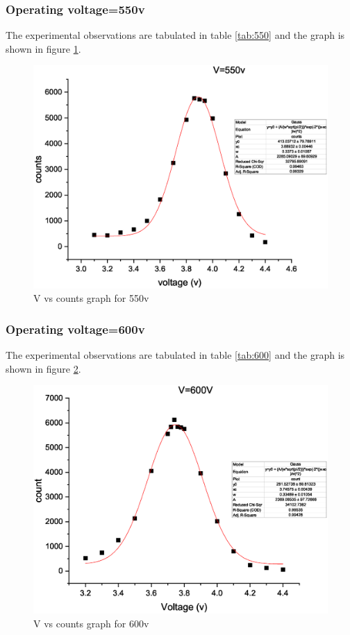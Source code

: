 		\subsubsection{Operating voltage=550v}
			The experimental observations are tabulated in table \ref{tab:550} and the graph is shown in figure \ref{graph:550}.
			
			\begin{figure}[H]
				\centering
				\includegraphics[width=0.9\columnwidth]{images/Graph2.eps}
				\caption{V vs counts graph for 550v}
				\label{graph:550}
			\end{figure}
		\subsubsection{Operating voltage=600v}
			The experimental observations are tabulated in table \ref{tab:600} and the graph is shown in figure \ref{graph:600}.
			
			\begin{figure}[H]
				\centering
				\includegraphics[width=0.9\columnwidth]{images/Graph3.eps}
				\caption{V vs counts graph for 600v}
				\label{graph:600}
			\end{figure}
